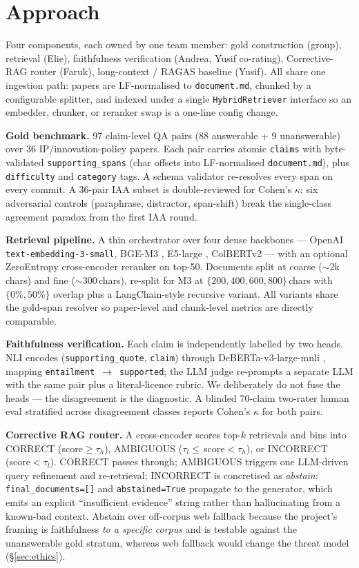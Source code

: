 \documentclass[11pt]{article}
\begin{document}
\section{Approach}
\label{sec:approach}

Four components, each owned by one team member: gold construction (group), retrieval (Elie), faithfulness verification (Andrea, Yusif co-rating), Corrective-RAG router (Faruk), long-context / RAGAS baseline (Yusif). All share one ingestion path: papers are LF-normalised to \texttt{document.md}, chunked by a configurable splitter, and indexed under a single \texttt{HybridRetriever} interface so an embedder, chunker, or reranker swap is a one-line config change.

\textbf{Gold benchmark.} 97 claim-level QA pairs (88 answerable + 9 unanswerable) over 36 IP/innovation-policy papers. Each pair carries atomic \texttt{claims} with byte-validated \texttt{supporting\_spans} (char offsets into LF-normalised \texttt{document.md}), plus \texttt{difficulty} and \texttt{category} tags. A schema validator re-resolves every span on every commit. A 36-pair IAA subset is double-reviewed for Cohen's $\kappa$; six adversarial controls (paraphrase, distractor, span-shift) break the single-class agreement paradox from the first IAA round.

\textbf{Retrieval pipeline.} A thin orchestrator over four dense backbones --- OpenAI \texttt{text-embedding-3-small}, BGE-M3 \citep{chen2024bgem3}, E5-large \citep{wang2024e5}, ColBERTv2 \citep{santhanam2022colbertv2} --- with an optional ZeroEntropy cross-encoder reranker on top-50. Documents split at coarse ($\sim$2k\,chars) and fine ($\sim$300\,chars), re-split for M3 at $\{200, 400, 600, 800\}$\,chars with $\{0\%, 50\%\}$ overlap plus a LangChain-style recursive variant. All variants share the gold-span resolver so paper-level and chunk-level metrics are directly comparable.

\textbf{Faithfulness verification.} Each claim is independently labelled by two heads. NLI encodes (\texttt{supporting\_quote}, \texttt{claim}) through DeBERTa-v3-large-mnli \citep{he2021debertav3}, mapping \texttt{entailment}~$\to$~\texttt{supported}; the LLM judge re-prompts a separate LLM with the same pair plus a literal-licence rubric. We deliberately do not fuse the heads --- the disagreement is the diagnostic. A blinded 70-claim two-rater human eval stratified across disagreement classes reports Cohen's $\kappa$ for both pairs.

\textbf{Corrective RAG router.} A cross-encoder \citep{yan2024corrective} scores top-$k$ retrievals and bins into CORRECT (score${\ge}\tau_h$), AMBIGUOUS ($\tau_l{\le}$\,score${<}\tau_h$), or INCORRECT (score${<}\tau_l$). CORRECT passes through; AMBIGUOUS triggers one LLM-driven query refinement and re-retrieval; INCORRECT is concretised as \emph{abstain}: \texttt{final\_documents=[]} and \texttt{abstained=True} propagate to the generator, which emits an explicit ``insufficient evidence'' string rather than hallucinating from a known-bad context. Abstain over off-corpus web fallback because the project's framing is faithfulness \emph{to a specific corpus} and is testable against the unanswerable gold stratum, whereas web fallback would change the threat model (\S\ref{sec:ethics}).
\end{document}
